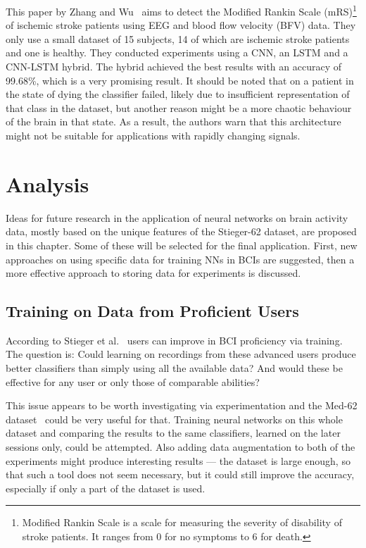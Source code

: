 \documentclass[english, he, bc, kiv, iso690alph]{fasthesis}
\begin{document}
This paper by Zhang and Wu~\cite{zhang:similar:20} aims to detect the Modified Rankin Scale (mRS)\footnote{Modified Rankin Scale is a scale for measuring the severity of disability of stroke patients. It ranges from 0 for no symptoms to 6 for death.} of ischemic stroke patients using EEG and blood flow velocity (BFV) data. They only use a small dataset of 15 subjects, 14 of which are ischemic stroke patients and one is healthy. They conducted experiments using a CNN, an LSTM and a CNN-LSTM hybrid. The hybrid achieved the best results with an accuracy of 99.68\%, which is a very promising result. It should be noted that on a patient in the state of dying the classifier failed, likely due to insufficient representation of that class in the dataset, but another reason might be a more chaotic behaviour of the brain in that state. As a result, the authors warn that this architecture might not be suitable for applications with rapidly changing signals.

\chapter{Analysis}

Ideas for future research in the application of neural networks on brain activity data, mostly based on the unique features of the Stieger-62 dataset, are proposed in this chapter. Some of these will be selected for the final application. First, new approaches on using specific data for training NNs in BCIs are suggested, then a more effective approach to storing data for experiments is discussed.

\section{Training on Data from Proficient Users}

According to Stieger et al.~\cite{data:stieger:21,stieger:mindfulness:20} users can improve in BCI proficiency via training. The question is: Could learning on recordings from these advanced users produce better classifiers than simply using all the available data? And would these be effective for any user or only those of comparable abilities?

This issue appears to be worth investigating via experimentation and the Med-62 dataset~\cite{data:stieger:21} could be very useful for that. Training neural networks on this whole dataset and comparing the results to the same classifiers, learned on the later sessions only, could be  attempted. Also adding data augmentation to both of the experiments might produce interesting results --- the dataset is large enough, so that such a tool does not seem necessary, but it could still improve the accuracy, especially if only a part of the dataset is used.
\end{document}
